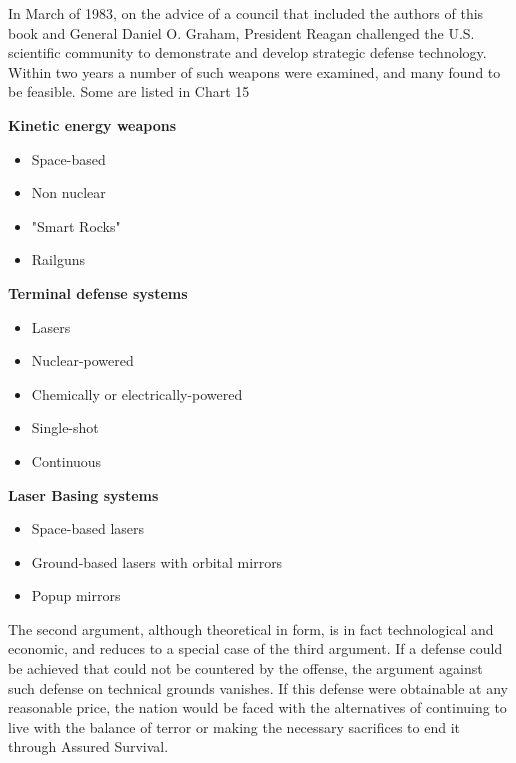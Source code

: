 \begin{mdframed}[backgroundcolor=black!10]
In March of 1983, on the advice of a council that included the authors of this book and General Daniel O. Graham, President Reagan challenged the U.S. scientific community to demonstrate and develop strategic defense technology. Within two years a number of such weapons were examined, and many found to be feasible. Some are listed in Chart 15
\end{mdframed}

\begin{mdframed}[backgroundcolor=black!10, frametitle={Potential Strategic Defense Systems}]
\textbf{Kinetic energy weapons}
    \begin{itemize}
        \item Space-based
        \item Non nuclear
        \item "Smart Rocks"
        \item Railguns
    \end{itemize}
\textbf{Terminal defense systems}
    \begin{itemize}
        \item Lasers
        \item Nuclear-powered
        \item Chemically or electrically-powered
        \item Single-shot 
        \item Continuous
    \end{itemize}
\textbf{Laser Basing systems}
    \begin{itemize}
        \item Space-based lasers
        \item Ground-based lasers with orbital mirrors
        \item Popup mirrors
    \end{itemize}
\end{mdframed}

The second argument, although theoretical in form, is in fact technological and economic, and reduces to a special case of the third argument. If a defense could be achieved that could not be countered by the offense, the argument against such defense on technical grounds vanishes. If this defense were obtainable at any reasonable price, the nation would be faced with the alternatives of continuing to live with the balance of terror or making the necessary sacrifices to end it through Assured Survival.

